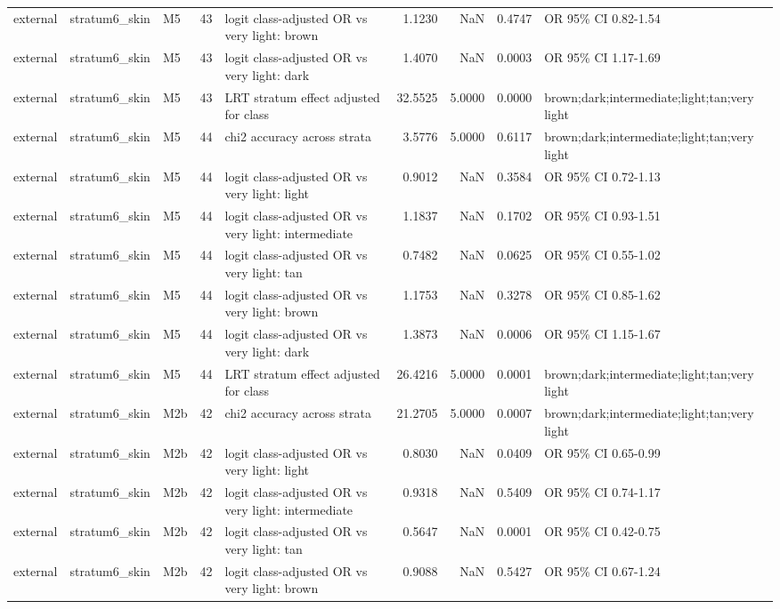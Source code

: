 \begin{tabular}{lllrlrrrl}
external & stratum6\_skin & M5 & 43 & logit class-adjusted OR vs very light: brown & 1.1230 & NaN & 0.4747 & OR 95\% CI 0.82-1.54 \\
external & stratum6\_skin & M5 & 43 & logit class-adjusted OR vs very light: dark & 1.4070 & NaN & 0.0003 & OR 95\% CI 1.17-1.69 \\
external & stratum6\_skin & M5 & 43 & LRT stratum effect adjusted for class & 32.5525 & 5.0000 & 0.0000 & brown;dark;intermediate;light;tan;very light \\
external & stratum6\_skin & M5 & 44 & chi2 accuracy across strata & 3.5776 & 5.0000 & 0.6117 & brown;dark;intermediate;light;tan;very light \\
external & stratum6\_skin & M5 & 44 & logit class-adjusted OR vs very light: light & 0.9012 & NaN & 0.3584 & OR 95\% CI 0.72-1.13 \\
external & stratum6\_skin & M5 & 44 & logit class-adjusted OR vs very light: intermediate & 1.1837 & NaN & 0.1702 & OR 95\% CI 0.93-1.51 \\
external & stratum6\_skin & M5 & 44 & logit class-adjusted OR vs very light: tan & 0.7482 & NaN & 0.0625 & OR 95\% CI 0.55-1.02 \\
external & stratum6\_skin & M5 & 44 & logit class-adjusted OR vs very light: brown & 1.1753 & NaN & 0.3278 & OR 95\% CI 0.85-1.62 \\
external & stratum6\_skin & M5 & 44 & logit class-adjusted OR vs very light: dark & 1.3873 & NaN & 0.0006 & OR 95\% CI 1.15-1.67 \\
external & stratum6\_skin & M5 & 44 & LRT stratum effect adjusted for class & 26.4216 & 5.0000 & 0.0001 & brown;dark;intermediate;light;tan;very light \\
external & stratum6\_skin & M2b & 42 & chi2 accuracy across strata & 21.2705 & 5.0000 & 0.0007 & brown;dark;intermediate;light;tan;very light \\
external & stratum6\_skin & M2b & 42 & logit class-adjusted OR vs very light: light & 0.8030 & NaN & 0.0409 & OR 95\% CI 0.65-0.99 \\
external & stratum6\_skin & M2b & 42 & logit class-adjusted OR vs very light: intermediate & 0.9318 & NaN & 0.5409 & OR 95\% CI 0.74-1.17 \\
external & stratum6\_skin & M2b & 42 & logit class-adjusted OR vs very light: tan & 0.5647 & NaN & 0.0001 & OR 95\% CI 0.42-0.75 \\
external & stratum6\_skin & M2b & 42 & logit class-adjusted OR vs very light: brown & 0.9088 & NaN & 0.5427 & OR 95\% CI 0.67-1.24 \\

\end{tabular}
